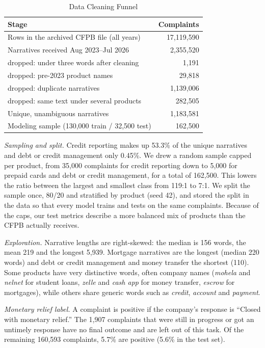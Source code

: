 \documentclass[conference]{IEEEtran}
\begin{document}
\begin{table}[!t]
\caption{Data Cleaning Funnel}
\label{tab:funnel}
\centering
\footnotesize
\begin{tabular}{@{}lr@{}}
\toprule
Stage & Complaints \\
\midrule
Rows in the archived CFPB file (all years) & 17,119,590 \\
Narratives received Aug 2023--Jul 2026 & 2,355,520 \\
\quad dropped: under three words after cleaning & 1,191 \\
\quad dropped: pre-2023 product names & 29,818 \\
\quad dropped: duplicate narratives & 1,139,006 \\
\quad dropped: same text under several products & 282,505 \\
Unique, unambiguous narratives & 1,183,581 \\
Modeling sample (130,000 train / 32,500 test) & 162,500 \\
\bottomrule
\end{tabular}
\end{table}

\textit{Sampling and split.} Credit reporting makes up 53.3\% of the unique narratives and debt or credit management only 0.45\%. We drew a random sample capped per product, from 35,000 complaints for credit reporting down to 5,000 for prepaid cards and debt or credit management, for a total of 162,500. This lowers the ratio between the largest and smallest class from 119:1 to 7:1. We split the sample once, 80/20 and stratified by product (seed 42), and stored the split in the data so that every model trains and tests on the same complaints. Because of the caps, our test metrics describe a more balanced mix of products than the CFPB actually receives.

\textit{Exploration.} Narrative lengths are right-skewed: the median is 156 words, the mean 219 and the longest 5,939. Mortgage narratives are the longest (median 220 words) and debt or credit management and money transfer the shortest (110). Some products have very distinctive words, often company names (\textit{mohela} and \textit{nelnet} for student loans, \textit{zelle} and \textit{cash app} for money transfer, \textit{escrow} for mortgages), while others share generic words such as \textit{credit}, \textit{account} and \textit{payment}.

\textit{Monetary relief label.} A complaint is positive if the company's response is ``Closed with monetary relief.'' The 1,907 complaints that were still in progress or got an untimely response have no final outcome and are left out of this task. Of the remaining 160,593 complaints, 5.7\% are positive (5.6\% in the test set).
\end{document}
